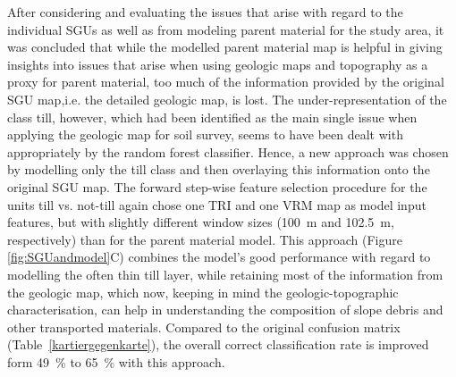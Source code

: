 \documentclass[preprint,12pt,authoryear]{elsarticle}
\begin{document}
After considering and evaluating the issues that arise with regard to the individual SGUs as well as from modeling parent material for the study area, it was concluded that while the modelled parent material map is helpful in giving insights into issues that arise when using geologic maps and topography as a proxy for parent material, too much of the information provided by the original SGU map,i.e. the detailed geologic map, is lost. The under-representation of the class till, however, which had been identified as the main single issue when applying the geologic map for soil survey, seems to have been dealt with appropriately by the random forest classifier. Hence, a new approach was chosen by modelling only the till class and then overlaying this information onto the original SGU map. The forward step-wise feature selection procedure for the units till vs. not-till again chose one TRI and one VRM map as model input features, but with slightly different window sizes (100~m and 102.5~m, respectively) than for the parent material model. This approach (Figure \ref{fig:SGUandmodel}C) combines the model's good performance with regard to modelling the often thin till layer, while retaining most of the information from the geologic map, which now, keeping in mind the geologic-topographic characterisation, can help in understanding the composition of slope debris and other transported materials. Compared to the original confusion matrix (Table~\ref{kartiergegenkarte}), the overall correct classification rate is improved form 49~\% to 65~\% with this approach.
\end{document}
